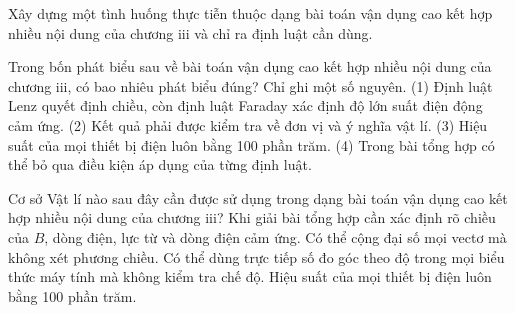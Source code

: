 \begin{bt}
Xây dựng một tình huống thực tiễn thuộc dạng bài toán vận dụng cao kết hợp nhiều nội dung của chương iii và chỉ ra định luật cần dùng.
\end{bt}

\begin{ex}
Trong bốn phát biểu sau về bài toán vận dụng cao kết hợp nhiều nội dung của chương iii, có bao nhiêu phát biểu đúng? Chỉ ghi một số nguyên. (1) Định luật Lenz quyết định chiều, còn định luật Faraday xác định độ lớn suất điện động cảm ứng. (2) Kết quả phải được kiểm tra về đơn vị và ý nghĩa vật lí. (3) Hiệu suất của mọi thiết bị điện luôn bằng 100 phần trăm. (4) Trong bài tổng hợp có thể bỏ qua điều kiện áp dụng của từng định luật.
\end{ex}

\begin{ex}
Cơ sở Vật lí nào sau đây cần được sử dụng trong dạng bài toán vận dụng cao kết hợp nhiều nội dung của chương iii?
\choice
{\True Khi giải bài tổng hợp cần xác định rõ chiều của $B$, dòng điện, lực từ và dòng điện cảm ứng.}
{Có thể cộng đại số mọi vectơ mà không xét phương chiều.}
{Có thể dùng trực tiếp số đo góc theo độ trong mọi biểu thức máy tính mà không kiểm tra chế độ.}
{Hiệu suất của mọi thiết bị điện luôn bằng 100 phần trăm.}
\end{ex}

